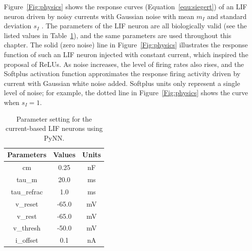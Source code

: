 	Figure~\ref{Fig:physics} shows the response curves (Equation~\ref{equ:siegert}) of an LIF neuron driven by noisy currents with Gaussian noise with mean $m_I$ and standard deviation $s_I$ .
	The parameters of the LIF neuron are all biologically valid (see the listed values in Table~\ref{tbl:pynnConfig}), and the same parameters are used throughout this chapter.
	The solid (zero noise) line in Figure~\ref{Fig:physics} illustrates the response function of such an LIF neuron injected with constant current, which inspired the proposal of ReLUs.
	As noise increases, the level of firing rates also rises, and the Softplus activation function approximates the response firing activity driven by current with Gaussian white noise added.
	Softplus units only represent a single level of noise; for example, the dotted line in Figure~\ref{Fig:physics} shows the curve when $s_I=1$.
	
		\begin{table}[bt]
			\centering
			\caption{\label{tbl:pynnConfig}Parameter setting for the current-based LIF neurons using PyNN.}
			\bgroup
			\def\arraystretch{1.4}
			\begin{tabular}{c c c}
				Parameters & Values & Units \\
				\hline
				cm & 0.25 & nF	\\
				tau\_m & 20.0 & ms\\
				tau\_refrac & 1.0 & ms\\
				v\_reset & -65.0 & mV\\
				v\_rest & -65.0 & mV\\
				v\_thresh & -50.0 & mV\\
				i\_offset & 0.1 & nA\\
				\hline
			\end{tabular}
			\egroup
		\end{table}
	

